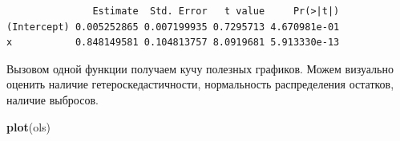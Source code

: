 \documentclass[]{book}
\newenvironment{Shaded}{\begin{snugshade}}{\end{snugshade}}
\newcommand{\CommentTok}[1]{\textcolor[rgb]{0.56,0.35,0.01}{\textit{#1}}}
\newcommand{\KeywordTok}[1]{\textcolor[rgb]{0.13,0.29,0.53}{\textbf{#1}}}
\newcommand{\NormalTok}[1]{#1}
\newcommand{\OperatorTok}[1]{\textcolor[rgb]{0.81,0.36,0.00}{\textbf{#1}}}
\newcommand{\StringTok}[1]{\textcolor[rgb]{0.31,0.60,0.02}{#1}}
\begin{document}
\begin{Shaded}
\end{Shaded}

\begin{verbatim}
               Estimate  Std. Error   t value     Pr(>|t|)
(Intercept) 0.005252865 0.007199935 0.7295713 4.670981e-01
x           0.848149581 0.104813757 8.0919681 5.913330e-13
\end{verbatim}

Вызовом одной функции получаем кучу полезных графиков. Можем визуально оценить наличие гетероскедастичности, нормальность распределения остатков, наличие выбросов.

\begin{Shaded}
\begin{Highlighting}[]
\KeywordTok{plot}\NormalTok{(ols)}
\end{Highlighting}
\end{Shaded}
\end{document}
